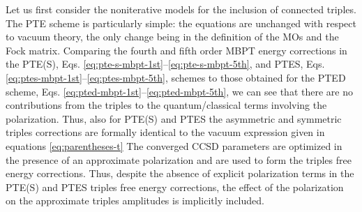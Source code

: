 Let us first consider the noniterative models for the inclusion of
connected triples.
The \acrshort{PTE} scheme is particularly simple: the equations are
unchanged with respect to vacuum theory, the only change being in the
definition of the \glspl{MO} and the Fock matrix.\autocite{Cammi2009-gu,
Begue2005-qn, Hasegawa2007-jt}
Comparing the fourth and fifth order \acrshort{MBPT} energy corrections
in the \acrshort{PTE(S)}, Eqs. \eqref{eq:pte-s-mbpt-1st}--\eqref{eq:pte-s-mbpt-5th}, and
\acrshort{PTES}, Eqs. \eqref{eq:ptes-mbpt-1st}--\eqref{eq:ptes-mbpt-5th}, schemes to
those obtained for the \acrshort{PTED} scheme, Eqs.
\eqref{eq:pted-mbpt-1st}--\eqref{eq:pted-mbpt-5th},
we can see that there are no contributions from the triples to the
quantum/classical terms involving the polarization.
Thus, also for \acrshort{PTE(S)} and \acrshort{PTES} the asymmetric and
symmetric triples corrections are formally identical to the vacuum
expression given in equations \eqref{eq:parentheses-t}
The converged \acrshort{CCSD} parameters are optimized in the presence of an
approximate polarization and are used to form the triples free energy
corrections.
Thus, despite the absence of explicit polarization terms in the
\acrshort{PTE(S)} and \acrshort{PTES} triples free energy corrections,
the effect of the polarization on the approximate triples amplitudes is
implicitly included.

